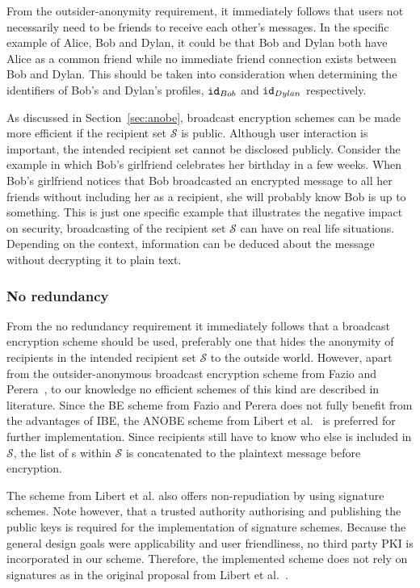From the outsider-anonymity requirement, it immediately follows that users not necessarily need to be friends to receive each other's messages. In the specific example of Alice, Bob and Dylan, it could be that Bob and Dylan both have Alice as a common friend while no immediate friend connection exists between Bob and Dylan. This should be taken into consideration when determining the identifiers of Bob's and Dylan's profiles, $\mathtt{id}_{Bob}$ and $\mathtt{id}_{Dylan}$ respectively.

As discussed in Section~\ref{sec:anobe}, broadcast encryption schemes can be made more efficient if the recipient set $\mathcal{S}$ is public. Although user interaction is important, the intended recipient set cannot be disclosed publicly. Consider the example in which Bob's girlfriend celebrates her birthday in a few weeks. When Bob's girlfriend notices that Bob broadcasted an encrypted message to all her friends without including her as a recipient, she will probably know Bob is up to something. This is just one specific example that illustrates the negative impact on security, broadcasting of the recipient set $\mathcal{S}$ can have on real life situations. Depending on the context, information can be deduced about the message without decrypting it to plain text.

\subsubsection{No redundancy}
From the no redundancy requirement it immediately follows that a broadcast encryption scheme should be used, preferably one that hides the anonymity of recipients in the intended recipient set $\mathcal{S}$ to the outside world. However, apart from the outsider-anonymous broadcast encryption scheme from Fazio and Perera~\cite{art:FazioP12}, to our knowledge no efficient schemes of this kind are described in literature. Since the BE scheme from Fazio and Perera does not fully benefit from the advantages of IBE, the ANOBE scheme from Libert et al.~\cite{art:LibertPQ12} is preferred for further implementation. Since recipients still have to know who else is included in $\mathcal{S}$, the list of \id{}s within $\mathcal{S}$ is concatenated to the plaintext message before encryption.

The scheme from Libert et al. also offers non-repudiation by using signature schemes. Note however, that a trusted authority authorising and publishing the public keys is required for the implementation of signature schemes. Because the general design goals were applicability and user friendliness, no third party PKI is incorporated in our scheme. Therefore, the implemented scheme does not rely on signatures as in the original proposal from Libert et al.~\cite{art:LibertPQ12}.

